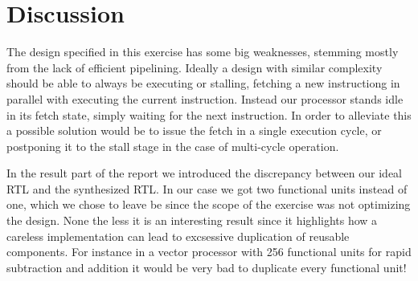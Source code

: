 \chapter{Discussion}

The design specified in this exercise has some big weaknesses, stemming mostly from the lack of efficient pipelining.
Ideally a design with similar complexity should be able to always be executing or stalling, fetching a new instructiong in parallel with executing the current instruction.
Instead our processor stands idle in its fetch state, simply waiting for the next instruction. In order to alleviate this a possible solution would be to issue the fetch in a single execution cycle, or postponing it to the stall stage in the case of multi-cycle operation.

In the result part of the report we introduced the discrepancy between our ideal RTL and the synthesized RTL. In our case we got two functional units instead of one, which we chose to leave be since the scope of the exercise was not optimizing the design.
None the less it is an interesting result since it highlights how a careless implementation can lead to excsessive duplication of reusable components. For instance in a vector processor with 256 functional units for rapid subtraction and addition it would be very bad to duplicate every functional unit!


